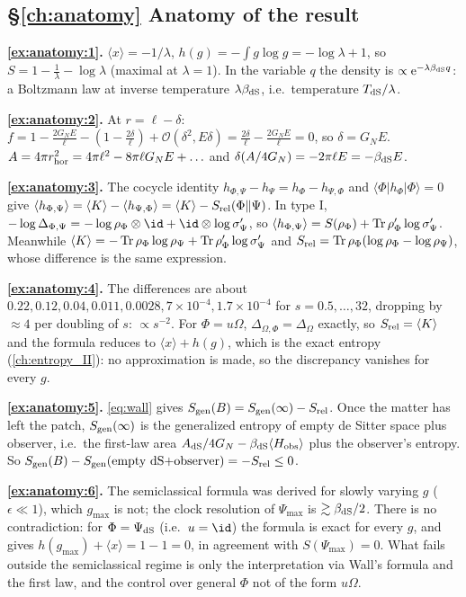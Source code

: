 {\subsection*{\S\ref{ch:anatomy} Anatomy of the result}
\textbf{\ref{ex:anatomy:1}.} $\langle x\rangle=-1/\lambda$, $h(g)=-\int g\log g=-\log\lambda+1$, so $S=1-\frac1\lambda-\log\lambda$ (maximal at $\lambda=1$). In the variable $q$ the density is $\propto\mathrm{e}^{-\lambda\beta_{\rm dS}q}$: a Boltzmann law at inverse temperature $\lambda\beta_{\rm dS}$, i.e.\ temperature $T_{\rm dS}/\lambda$.\par
\textbf{\ref{ex:anatomy:2}.} At $r=\ell-\delta$: $f=1-\frac{2G_NE}\ell-(1-\frac{2\delta}\ell)+\mathcal O(\delta^2,E\delta)=\frac{2\delta}\ell-\frac{2G_NE}\ell=0$, so $\delta=G_NE$. $A=4\pi r_{\rm hor}^2=4\pi\ell^2-8\pi\ell G_NE+\ldots$ and $\delta(A/4G_N)=-2\pi\ell E=-\beta_{\rm dS}E$.\par
\textbf{\ref{ex:anatomy:3}.} The cocycle identity $h_{\Phi,\Psi}-h_\Psi=h_\Phi-h_{\Psi,\Phi}$ and $\langle\Phi|h_\Phi|\Phi\rangle=0$ give $\langle h_{\Phi,\Psi}\rangle=\langle K\rangle-\langle h_{\Psi,\Phi}\rangle=\langle K\rangle-S_{\rm rel}(\Phi\|\Psi)$. In type I, $-\log\Delta_{\Phi,\Psi}=-\log\rho_\Phi\otimes\id+\id\otimes\log\sigma'_\Psi$, so $\langle h_{\Phi,\Psi}\rangle=S(\rho_\Phi)+\operatorname{Tr}\rho'_\Phi\log\sigma'_\Psi$. Meanwhile $\langle K\rangle=-\operatorname{Tr}\rho_\Phi\log\rho_\Psi+\operatorname{Tr}\rho'_\Phi\log\sigma'_\Psi$ and $S_{\rm rel}=\operatorname{Tr}\rho_\Phi(\log\rho_\Phi-\log\rho_\Psi)$, whose difference is the same expression.\par
\textbf{\ref{ex:anatomy:4}.} The differences are about $0.22,0.12,0.04,0.011,0.0028,7\times10^{-4},1.7\times10^{-4}$ for $s=0.5,\dots,32$, dropping by $\approx4$ per doubling of $s$: $\propto s^{-2}$. For $\Phi=u\Omega$, $\Delta_{\Omega,\Phi}=\Delta_\Omega$ exactly, so $S_{\rm rel}=\langle K\rangle$ and the formula reduces to $\langle x\rangle+h(g)$, which is the exact entropy (\cref{ch:entropy_II}): no approximation is made, so the discrepancy vanishes for every $g$.\par
\textbf{\ref{ex:anatomy:5}.} \eqref{eq:wall} gives $S_{\mathrm{gen}}(B)=S_{\mathrm{gen}}(\infty)-S_{\rm rel}$. Once the matter has left the patch, $S_{\mathrm{gen}}(\infty)$ is the generalized entropy of empty de Sitter space plus observer, i.e.\ the first-law area $A_{\rm dS}/4G_N-\beta_{\rm dS}\langle H_{\rm obs}\rangle$ plus the observer's entropy. So $S_{\mathrm{gen}}(B)-S_{\mathrm{gen}}(\text{empty dS+observer})=-S_{\rm rel}\le0$.\par
\textbf{\ref{ex:anatomy:6}.} The semiclassical formula was derived for slowly varying $g$ ($\epsilon\ll1$), which $g_{\max}$ is not; the clock resolution of $\Psi_{\max}$ is $\gtrsim\beta_{\rm dS}/2$. There is no contradiction: for $\Phi=\Psi_{\rm dS}$ (i.e.\ $u=\id$) the formula is exact for every $g$, and gives $h(g_{\max})+\langle x\rangle=1-1=0$, in agreement with $S(\Psi_{\max})=0$. What fails outside the semiclassical regime is only the interpretation via Wall's formula and the first law, and the control over general $\Phi$ not of the form $u\Omega$.\par

}
